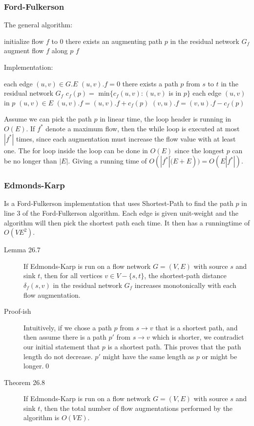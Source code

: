\subsubsection{Ford-Fulkerson}
The general algorithm:
\begin{codebox}
\li initialize flow $f$ to 0
\li \While there exists an augmenting path $p$ in the residual network $G_f$
    \Do
\li      augment flow $f$ along $p$
    \End
\li \Return $f$
\end{codebox}

\noindent Implementation:

\begin{codebox}
\li \For each edge $(u,v)\in G.E$ \Do
\li   $(u,v).f = 0$ \End
\li \While there exists a path $p$ from $s$ to $t$ in the residual network $G_f$
\li   \Do $c_f(p) =$ min$\{c_f(u,v):(u,v)$ is in $p\}$
\li   \For each edge $(u,v)$ in $p$ \Do
\li     \If $(u,v) \in E$ \Do
\li       $(u,v).f = (u,v).f + c_f(p)$
\li     \Else $(v,u).f = (v,u).f - c_f(p)$
\end{codebox}

\noindent Assume we can pick the path $p$ in linear time, the loop header is
running in $O(E)$. If $f^*$ denote a maximum flow, then the while loop is
executed at most $|f^*|$ times, since each augmentation must increase the flow
value with at least one. The for loop inside the loop can be done in $O(E)$
since the longest $p$ can be no longer than $|E|$. Giving a running time of
$O(|f^*| \dot (E+E)) = O(E|f^*|)$.

\subsubsection{Edmonds-Karp}
Is a Ford-Fulkerson implementation that uses Shortest-Path to find the path $p$
in line 3 of the Ford-Fulkerson algorithm. Each edge is given unit-weight and
the algorithm will then pick the shortest path each time. It then has a
runningtime of $O(VE^2)$.

\begin{description}
\item[Lemma 26.7] If Edmonds-Karp is run on a flow network $G = (V,E)$ with
  source $s$ and sink $t$, then for all vertices $v\in V - \{s,t\}$, the
  shortest-path distance $\delta_f(s,v)$ in the residual network $G_f$ increases
  monotonically with each flow augmentation.
\item[Proof-ish] Intuitively, if we chose a path $p$ from $s\to v$ that is a
  shortest path, and then assume there is a path $p'$ from $s\to v$ which is
  shorter, we contradict our initial statement that $p$ is a shortest path. This
  proves that the path length do not decrease. $p'$ might have the same length
  as $p$ or might be longer.\qed
\end{description}

\begin{description}
\item[Theorem 26.8] If Edmonds-Karp is run on a flow network $G = (V,E)$ with
  source $s$ and sink $t$, then the total number of flow augmentations performed
  by the algorithm is $O(VE)$.
\end{description}
